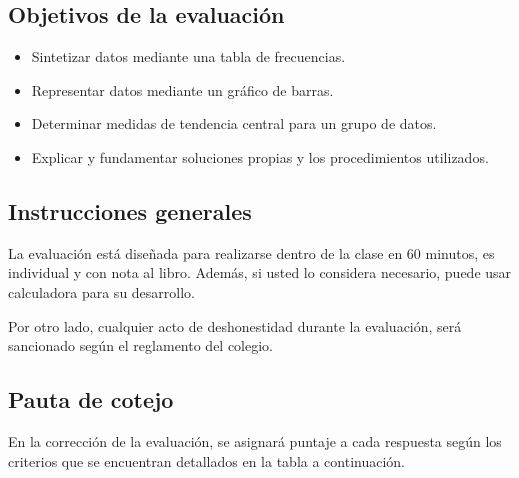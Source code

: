 \documentclass{cdplf-prueba}
\begin{document}
\begin{tcbraster}[enhanced,raster columns=3,raster width=\linewidth,raster column skip=3pt,raster force size=false]
    \begin{caja}[title={\sffamily\scshape\bfseries Nombre},height=30pt,add to width=4cm]
    \end{caja}
    \begin{caja}[title={\sffamily\scshape\bfseries Puntaje},height=30pt,add to width=-2cm]
    \end{caja}
    \begin{caja}[title={\sffamily\scshape\bfseries Nota},height=30pt,add to width=-2cm]
    \end{caja}                    
\end{tcbraster}

\subsection*{Objetivos de la evaluación}
\begin{itemize}[]
    \item Sintetizar datos mediante una tabla de frecuencias.
    \item Representar datos mediante un gráfico de barras.
    \item Determinar medidas de tendencia central para un grupo de datos.
    \item Explicar y fundamentar soluciones propias y los procedimientos utilizados.
\end{itemize}

\subsection*{Instrucciones generales}

La evaluación está diseñada para realizarse dentro de la clase en 60 minutos, es individual y 
con nota al libro. Además, si usted lo considera necesario, puede usar calculadora para su
desarrollo.

Por otro lado, cualquier acto de deshonestidad durante la evaluación, será sancionado según 
el reglamento del colegio.

\subsection*{Pauta de cotejo}

En la corrección de la evaluación, se asignará puntaje a cada respuesta según
los criterios que se encuentran detallados en la tabla a continuación.
\end{document}
